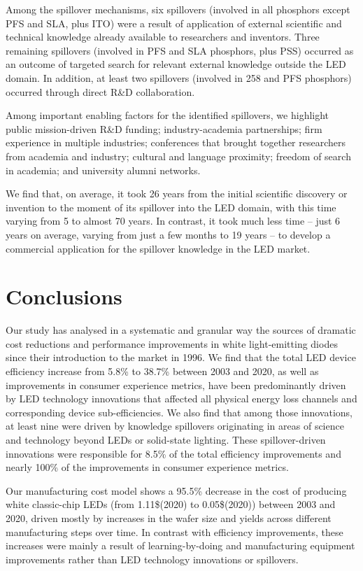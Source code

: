 \documentclass[twoside,twocolumn,9pt]{article}
\begin{document}
Among the spillover mechanisms, six spillovers (involved in all phosphors except PFS and SLA, plus ITO) were a result of application of external scientific and technical knowledge already available to researchers and inventors. Three remaining spillovers (involved in PFS and SLA phosphors, plus PSS) occurred as an outcome of targeted search for relevant external knowledge outside the LED domain. In addition, at least two spillovers (involved in 258 and PFS phosphors) occurred through direct R\&D collaboration.

Among important enabling factors for the identified spillovers, we highlight public mission-driven R\&D funding; industry-academia partnerships; firm experience in multiple industries; conferences that brought together researchers from academia and industry; cultural and language proximity; freedom of search in academia; and university alumni networks.

We find that, on average, it took 26 years from the initial scientific discovery or invention to the moment of its spillover into the LED domain, with this time varying from 5 to almost 70 years. In contrast, it took much less time – just 6 years on average, varying from just a few months to 19 years – to develop a commercial application for the spillover knowledge in the LED market. 

\section{Conclusions}

Our study has analysed in a systematic and granular way the sources of dramatic cost reductions and performance improvements in white light-emitting diodes since their introduction to the market in 1996. We find that the total LED device efficiency increase from 5.8\% to 38.7\% between 2003 and 2020, as well as improvements in consumer experience metrics, have been predominantly driven by LED technology innovations that affected all physical energy loss channels and corresponding device sub-efficiencies. We also find that among those innovations, at least nine were driven by knowledge spillovers originating in areas of science and technology beyond LEDs or solid-state lighting. These spillover-driven innovations were responsible for 8.5\% of the total efficiency improvements and nearly 100\% of the improvements in consumer experience metrics. 

Our manufacturing cost model shows a 95.5\% decrease in the cost of producing white classic-chip LEDs (from 1.11\$(2020) to 0.05\$(2020)) between 2003 and 2020, driven mostly by increases in the wafer size and yields across different manufacturing steps over time. In contrast with efficiency improvements, these increases were mainly a result of learning-by-doing and manufacturing equipment improvements rather than LED technology innovations or spillovers. 
\end{document}
